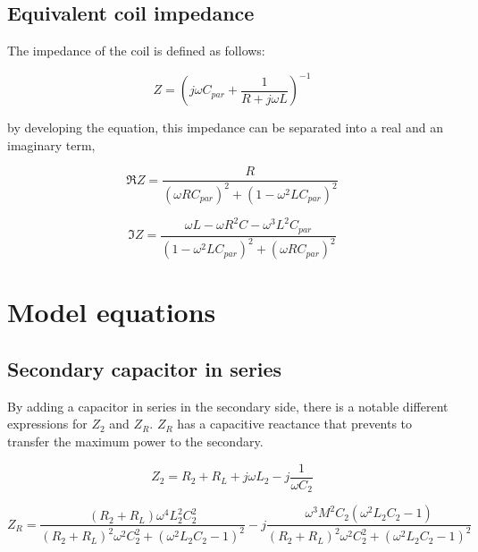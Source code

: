 \section{Equivalent coil impedance} \label{AppendixSection: impedance}

The impedance of the coil is defined as follows:

\begin{equation}
Z = (j\omega{C_{par}}+\frac{1}{R+j\omega{L}})^{-1}
\end{equation}

by developing the equation, this impedance can be separated into a real and an imaginary term,

\begin{equation}
\Re{Z}=\frac{R}{(\omega{R}C_{par})^2+(1-\omega^2LC_{par})^2}
\end{equation}

\begin{equation}
\Im{Z}=\frac{\omega{L}-\omega{R^2}C-\omega^3L^2C_{par}}{(1-\omega^2LC_{par})^2+(\omega{R}C_{par})^2}
\end{equation}





\chapter{Model equations} \label{Appendix: A}
\section{Secondary capacitor in series} \label{sec:secondaryS}

By adding a capacitor in series in the secondary side, there is a notable different expressions for $Z_2$ and $Z_R$. $Z_R$ has a capacitive reactance that prevents to transfer the maximum power to the secondary. 

\begin{equation}
Z_2 = R_2+R_L+j\omega{L_2}-j\frac{1}{\omega{C_2}}
\end{equation}

\begin{equation}
Z_R = \frac{(R_2+R_L)\omega^{4}L_2^{2}C_2^{2}}{(R_2+R_L)^{2}\omega^{2}C_2^{2}+(\omega^{2}L_2C_2-1)^{2}}-j\frac{\omega^{3}M^{2}C_2(\omega^{2}L_2C_2-1)}{(R_2+R_L)^{2}\omega^{2}C_2^{2}+(\omega^{2}L_2C_2-1)^{2}}
\end{equation}
\\

